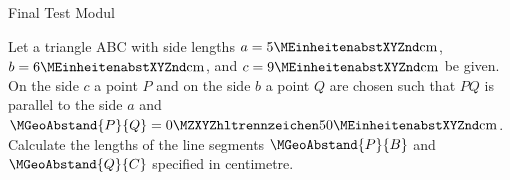 \begin{MTest}{Final Test Modul }
\begin{MExercise} %
Let a triangle ABC with side lengths
$a = 5\MEinheit{cm}$,
$b = 6\MEinheit{cm}$, and
$c = 9\MEinheit{cm}$
be given. On the side $c$ a point $P$ and on the side $b$ a point $Q$ 
are chosen such that $PQ$ is parallel to the side $a$ and 
$\MGeoAbstand{P}{Q} = \MZahl{0}{50}\MEinheit{cm}$. Calculate the lengths 
of the line segments $\MGeoAbstand{P}{B}$ and $\MGeoAbstand{Q}{C}$ specified in centimetre.
\par
\begin{MExerciseItems}
\item {}
\item {}
\end{MExerciseItems}
\end{MExercise}



\end{MTest}
